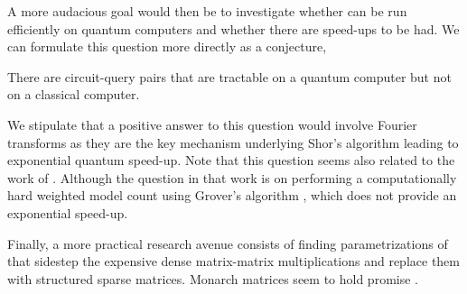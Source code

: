 A more audacious goal would then be to investigate whether \puncs can be run efficiently on quantum computers and whether there are speed-ups to be had. We can formulate this question more directly as a conjecture,

\begin{conjecture}
	There are circuit-query pairs that are tractable on a quantum computer but not on a classical computer.
\end{conjecture}


We stipulate that a positive answer to this question would involve Fourier transforms as they are the key mechanism underlying Shor's algorithm \citep{shor1994algorithms} leading to exponential quantum speed-up.
Note that this question seems also related to the work of \citet{riguzzi2024quantum}. Although the question in that work is on performing a computationally hard weighted model count using Grover's algorithm \citep{grover1996fast}, which does not provide an exponential speed-up.

Finally, a more practical research avenue consists of finding parametrizations of \puncs that sidestep the expensive dense matrix-matrix multiplications and replace them with structured sparse matrices. Monarch matrices seem to hold promise \citep{dao2022monarch,ZhangCoLoRAI25b}.











